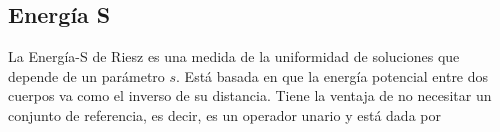 



\subsection{Energía S} \label{sec:Energía-S}
La Energía-S de Riesz \cite{sEnergy} es una medida de la uniformidad de soluciones que depende de un parámetro $s$. Está basada en que la energía potencial entre dos cuerpos va como el inverso de su distancia.  Tiene la ventaja de no necesitar un conjunto de referencia, es decir, es un operador unario y está dada por 

